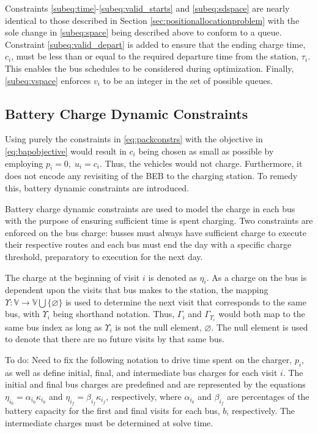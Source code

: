 \documentclass[utf8]{FrontiersinHarvard}
\newcommand{\TODO}[1]{{\color{green} To do: #1}}                                %
\begin{document}
Constraints \eqref{subeq:time}-\eqref{subeq:valid_starts} and \eqref{subeq:sdspace} are nearly identical to those
described in Section \ref{sec:positionallocationproblem} with the sole change in \eqref{subeq:space} being described
above to conform to a queue. Constraint \eqref{subeq:valid_depart} is added to ensure that the ending charge time,
$c_i$, must be less than or equal to the required departure time from the station, $\tau_i$. This enables the bus schedules
to be considered during optimization. Finally, \eqref{subeq:vspace} enforces $v_i$ to be an integer in the set of
possible queues.

\subsection{Battery Charge Dynamic Constraints}
\label{sec:batt_dynamics}
Using purely the constraints in \eqref{eq:packconstrs} with the objective in \eqref{eq:bapobjective} would result in
$c_i$ being chosen as small as possible by employing $p_i = 0,\; u_i = c_i$. Thus, the vehicles would not charge.
Furthermore, it does not encode any revisiting of the BEB to the charging station. To remedy this, battery dynamic
constraints are introduced.

Battery charge dynamic constraints are used to model the charge in each bus with the purpose of ensuring sufficient time
is spent charging. Two constraints are enforced on the bus charge: busses must always have sufficient charge to execute
their respective routes and each bus must end the day with a specific charge threshold, preparatory to execution for the
next day.

The charge at the beginning of visit $i$ is denoted as $\eta_i$. As a charge on the bus is dependent upon the visits that
bus makes to the station, the mapping $\Upsilon: \mathbb{V} \rightarrow \mathbb{V} \bigcup \{\varnothing\}$ is used to determine the next visit
that corresponds to the same bus, with $\Upsilon_i$ being shorthand notation. Thus, $\Gamma_i$ and $\Gamma_{\Upsilon_i}$ would both map to the
same bus index as long as $\Upsilon_i$ is not the null element, $\varnothing$. The null element is used to denote that there
are no future visits by that same bus.

\TODO{Need to fix the following notation} to drive time spent on the charger, $p_i$, as well as define initial, final,
and intermediate bus charges for each visit $i$. The initial and final bus charges are predefined and are represented by
the equations $\eta_{i_0} = \alpha_{i_0} \kappa_{i_0}$ and $\eta_{i_f} = \beta_{i_f} \kappa_{i_f}$, respectively, where $\alpha_{i_0}$ and $\beta_{i_f}$
are percentages of the battery capacity for the first and final visits for each bus, $b$, respectively. The intermediate
charges must be determined at solve time.
\end{document}

